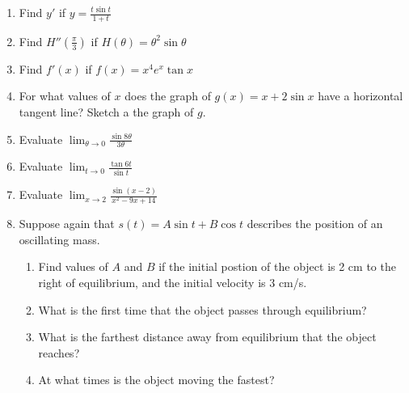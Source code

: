 \documentclass[11pt]{article}
\begin{document}
\begin{enumerate}
\item{Find $y'$ if $y = \frac{t\sin{t}}{1+t}$}
  \vspace{1.5in}
\item{Find $H''\left(\frac{\pi}{3}\right)$ if $H(\theta) = \theta^2\sin{\theta}$}
  \vspace{1.5in}
\item{Find $f'(x)$ if $f(x) = x^4e^x\tan{x}$}
  \vspace{1.5in}
\item{For what values of $x$ does the graph of $g(x) = x+ 2\sin{x}$ have a horizontal tangent line?  Sketch a the graph of $g$.}
  \vspace{1.5in}

  \pagebreak
\item{Evaluate $\lim_{\theta \to 0}\frac{\sin{8\theta}}{3\theta}$}
  \vspace{1.5in}
\item{Evaluate $\lim_{t \to 0}\frac{\tan{6t}}{\sin{t}}$}
  \vspace{1.5in}
\item{Evaluate $\lim_{x \to 2}\frac{\sin{(x-2)}}{x^2-9x+14}$}
  \vspace{1.5in}
\item{Suppose again that $s(t) = A\sin{t} + B\cos{t}$ describes the position of an oscillating mass.
\begin{enumerate}
\item{Find values of $A$ and $B$ if the initial postion of the object is 2 cm to the right of equilibrium, and the initial velocity is 3 cm/s.}
  \item{What is the first time that the object passes through equilibrium?}
  \item{What is the farthest distance away from equilibrium that the object reaches? }
  \item{At what times is the object moving the fastest?}
    
\end{enumerate}
}


\end{enumerate}


\pagebreak
\end{document}
